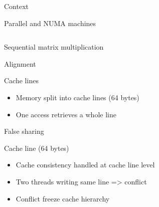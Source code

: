 \documentclass[xcolor={usenames,dvipsnames},hyperref={pdfusetitle}]{beamer}
\begin{document}
\begin{section}{Context}
\begin{frame}{Parallel and NUMA machines}
    \begin{columns}
        \begin{column}{.2\linewidth}
            \begin{block}{}
            \end{block}
        \end{column}
        \begin{column}{.8\linewidth}
            \centering
            \scalebox{.6}{
                
            }
        \end{column}
    \end{columns}
\end{frame}

\begin{frame}{Sequential matrix multiplication}
    \centering
    \scalebox{.6}{
        
    }
\end{frame}

\begin{frame}{Alignment}
    \centering
    \scalebox{.8}{
        
    }
    \begin{block}{Cache lines}
        \begin{itemize}
            \item Memory split into cache lines (64 bytes)
            \item One access retrieves a whole line
        \end{itemize}
    \end{block}
\end{frame}

\begin{frame}{False sharing}
    \centering
    \scalebox{.8}{
        
    }
    \begin{block}{Cache line (64 bytes)}
        \begin{itemize}
            \item Cache consistency handled at cache line level
            \item Two threads writing same line => conflict
            \item Conflict freeze cache hierarchy
        \end{itemize}
    \end{block}
\end{frame}


\end{section}
\end{document}
